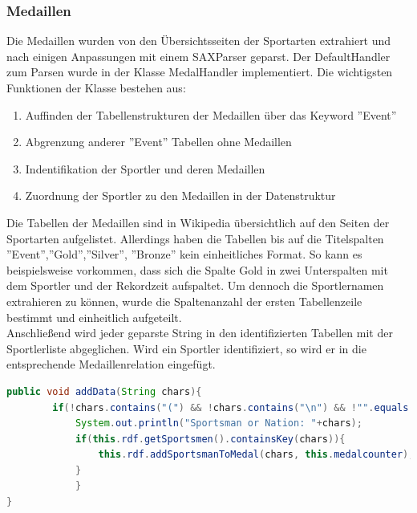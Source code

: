 \documentclass[pagesize=auto, titlepage=on]{scrartcl}
\begin{document}
\subsubsection{Medaillen}
Die Medaillen wurden von den Übersichtsseiten der Sportarten extrahiert und nach einigen Anpassungen mit einem SAXParser geparst. Der DefaultHandler zum Parsen wurde in der Klasse MedalHandler implementiert.
Die wichtigsten Funktionen der Klasse bestehen aus:
\begin{enumerate}
\item Auffinden der Tabellenstrukturen der Medaillen über das Keyword ''Event''
\item Abgrenzung anderer ''Event'' Tabellen ohne Medaillen
\item Indentifikation der Sportler und deren Medaillen
\item Zuordnung der Sportler zu den Medaillen in der Datenstruktur
\end{enumerate}
Die Tabellen der Medaillen sind in Wikipedia übersichtlich auf den Seiten der Sportarten aufgelistet. Allerdings haben die Tabellen bis auf die Titelspalten ''Event'',''Gold'',''Silver'', ''Bronze'' kein einheitliches Format. So kann es beispielsweise vorkommen, dass sich die Spalte Gold in zwei Unterspalten mit dem Sportler und der Rekordzeit aufspaltet. Um dennoch die Sportlernamen extrahieren zu können, wurde die Spaltenanzahl der ersten Tabellenzeile bestimmt und einheitlich aufgeteilt.\\
Anschließend wird jeder geparste String in den identifizierten Tabellen mit der Sportlerliste abgeglichen. Wird ein Sportler identifiziert, so wird er in die entsprechende Medaillenrelation eingefügt.
\begin{lstlisting}[language=Java]
public void addData(String chars){
	    if(!chars.contains("(") && !chars.contains("\n") && !"".equals(chars) && !" ".equals(chars) && !chars.matches("[0-9]+")){
	        System.out.println("Sportsman or Nation: "+chars);
	        if(this.rdf.getSportsmen().containsKey(chars)){
	            this.rdf.addSportsmanToMedal(chars, this.medalcounter);
	        }
	        }
}
\end{lstlisting}
\end{document}
